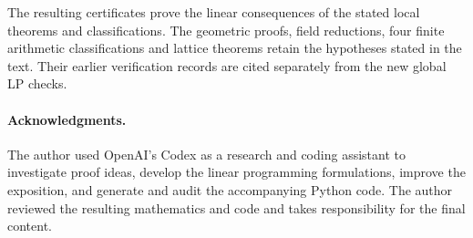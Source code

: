\documentclass[11pt]{article}
\theoremstyle{definition}
\theoremstyle{remark}
\numberwithin{equation}{section}
\begin{document}
The resulting certificates prove the linear consequences of the
stated local theorems and classifications. The geometric proofs,
field reductions, four finite arithmetic classifications and lattice
theorems retain the hypotheses stated in the text. Their earlier
verification records are cited separately from the new global LP
checks.

\paragraph{Acknowledgments.}
The author used OpenAI's Codex as a research and coding assistant to
investigate proof ideas, develop the linear programming formulations,
improve the exposition, and generate and audit the accompanying Python
code. The author reviewed the resulting mathematics and code and takes
responsibility for the final content.



\end{document}
